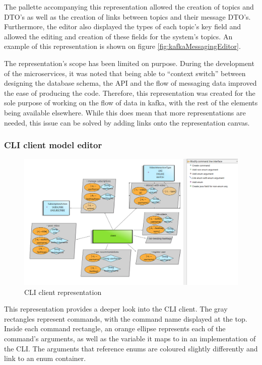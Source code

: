 \documentclass[parskip=full]{article}
\begin{document}
    The pallette accompanying this representation allowed the creation of topics and DTO's as well as the creation of links between topics and their message DTO's.
    Furthermore, the editor also displayed the types of each topic's key field and allowed the editing and creation of these fields for the system's topics.
    An example of this representation is shown on figure \ref{fig:kafkaMessagingEditor}.

    The representation's scope has been limited on purpose.
    During the development of the microservices, it was noted that being able to ``context switch'' between designing the database schema, the API and the flow of messaging data improved the ease of producing the code.
    Therefore, this representation was created for the sole purpose of working on the flow of data in kafka, with the rest of the elements being available elsewhere.
    While this does mean that more representations are needed, this issue can be solved by adding links onto the representation canvas.
    \subsubsection{CLI client model editor}
    \begin{figure}
        \includegraphics[height=0.15\paperheight]{cli-editor-with-pallette}
        \caption{CLI client representation}
        \label{fig:cliEditor}
        \vspace{-1em}
    \end{figure}
    This representation provides a deeper look into the CLI client.
    The gray rectangles represent commands, with the command name displayed at the top.
    Inside each command rectangle, an orange ellipse represents each of the command's arguments, as well as the variable it maps to in an implementation of the CLI.
    The arguments that reference enums are coloured slightly differently and link to an enum container.
\end{document}
